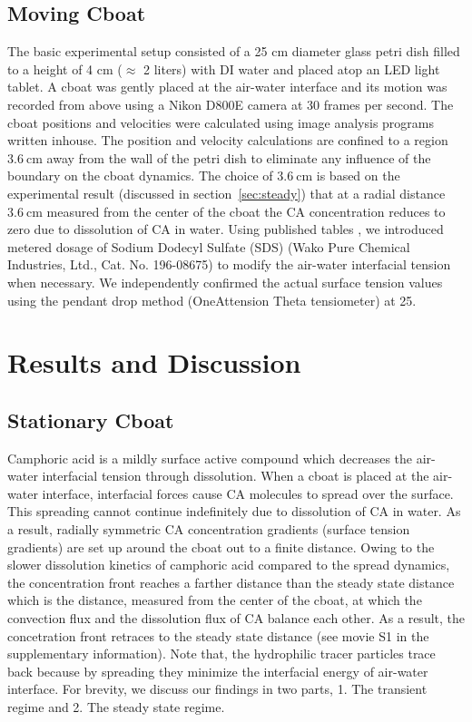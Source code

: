 \documentclass[journal=langd5, manuscript=article, layout=twocolumn]{achemso}
\begin{document}
\subsection{Moving Cboat}
The basic experimental setup consisted of a 25 $\mathrm{cm}$ diameter glass petri dish filled to a height of 4 cm ($\approx$ 2 liters) with DI water and placed atop an LED light tablet. A cboat was gently placed at the air-water interface and its motion was recorded from above using a Nikon D800E camera at 30 frames per second. The cboat positions and velocities were calculated using image analysis programs written inhouse. The position and velocity calculations are confined to a region $3.6\ \mathrm{cm}$ away from the wall of the petri dish to eliminate any influence of the boundary on the cboat dynamics. The choice of $3.6\ \mathrm{cm}$ is based on the experimental result (discussed in section~\ref{sec:steady}) that at a radial distance $3.6\ \mathrm{cm}$ measured from the center of the cboat the CA concentration reduces to zero due to dissolution of CA in water. Using published tables \cite{mysels1986}, we introduced metered dosage of Sodium Dodecyl Sulfate (SDS) (Wako Pure Chemical Industries, Ltd., Cat. No. 196-08675) to modify the air-water interfacial tension when necessary. We independently confirmed the actual surface tension values using the pendant drop method (OneAttension Theta tensiometer) at 25\celsius.

\section{Results and Discussion}
\subsection{Stationary Cboat}
\label{sec:statboat}
Camphoric acid is a mildly surface active compound which decreases the air-water interfacial tension through dissolution. When a cboat is placed at the air-water interface, interfacial forces cause CA molecules to spread over the surface. This spreading cannot continue indefinitely due to dissolution of CA in water. As a result, radially symmetric CA concentration gradients (surface tension gradients) are set up around the cboat out to a finite distance. Owing to the slower dissolution kinetics of camphoric acid compared to the spread dynamics, the concentration front reaches a farther distance than the steady state distance which is the distance, measured from the center of the cboat, at which the convection flux and the dissolution flux of CA balance each other. As a result, the concetration front retraces to the steady state distance (see movie S1 in the supplementary information). Note that, the hydrophilic tracer particles trace back because by spreading they minimize the interfacial energy of air-water interface\cite{nudurupati2009}. For brevity, we discuss our findings in two parts, 1. The transient regime and 2. The steady state regime. 
\end{document}
